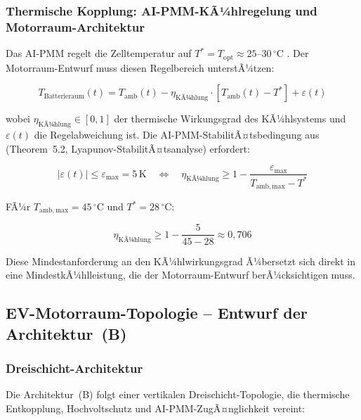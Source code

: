 ﻿\documentclass[12pt,a4paper]{article}
\begin{document}
\subsubsection{Thermische Kopplung: AI-PMM-KÃ¼hlregelung und Motorraum-Archi\-tektur}

Das AI-PMM regelt die Zelltemperatur auf $T^* = T_\mathrm{opt} \approx 25\text{--}30\,^\circ\mathrm{C}$
\cite{Epp2026liion}. Der Motorraum-Entwurf muss diesen Regelbereich unterstÃ¼tzen:

\begin{equation}
	T_\mathrm{Batterieraum}(t) = T_\mathrm{amb}(t) - \eta_\mathrm{KÃ¼hlung}
	\cdot \left[T_\mathrm{amb}(t) - T^*\right] + \varepsilon(t)
	\label{eq:batt_temp_eq}
\end{equation}

wobei $\eta_\mathrm{KÃ¼hlung} \in [0,1]$ der thermische Wirkungsgrad des
KÃ¼hlsystems und $\varepsilon(t)$ die Regelabweichung ist. Die AI-PMM-StabilitÃ¤tsbedingung
aus \cite{Epp2026liion} (Theorem~5.2, Lyapunov-StabilitÃ¤tsanalyse) erfordert:

\begin{equation}
	|\varepsilon(t)| \leq \varepsilon_\mathrm{max} = 5\,\mathrm{K}
	\quad \Leftrightarrow \quad
	\eta_\mathrm{KÃ¼hlung} \geq 1 - \frac{\varepsilon_\mathrm{max}}{T_\mathrm{amb,max} - T^*}
	\label{eq:kuehlwirkungsgrad}
\end{equation}

FÃ¼r $T_\mathrm{amb,max} = 45\,^\circ\mathrm{C}$ und $T^* = 28\,^\circ\mathrm{C}$:

\begin{equation}
	\eta_\mathrm{KÃ¼hlung} \geq 1 - \frac{5}{45 - 28} \approx 0{,}706
	\label{eq:kuehlwirkungsgrad_num}
\end{equation}

Diese Mindestanforderung an den KÃ¼hlwirkungsgrad Ã¼bersetzt sich direkt in eine
MindestkÃ¼hlleistung, die der Motorraum-Entwurf berÃ¼cksichtigen muss.

\subsection{EV-Motorraum-Topologie -- Entwurf der Architektur~(B)}

\subsubsection{Dreischicht-Architektur}

Die Architektur~(B) folgt einer vertikalen Dreischicht-Topologie, die thermische
Entkopplung, Hochvoltschutz und AI-PMM-ZugÃ¤nglichkeit vereint:
\end{document}
